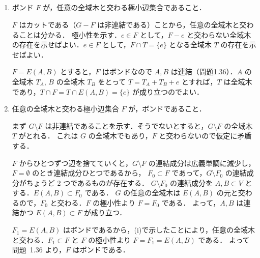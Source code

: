 \subsection{}
\begin{enumerate}
 \item ボンド $F$ が，任意の全域木と交わる極小辺集合であること．
 
 $F$ はカットである（$G-F$ は非連結である）ことから，任意の全域木と交わることは分かる．
 極小性を示す．$e\in F$ として，$F-e$ と交わらない全域木の存在を示せばよい．$e\in F$ として，$F\cap T = \{e\}$ となる全域木 $T$ の存在を示せばよい．
 
 $F = E(A, B)$ とすると，$F$ はボンドなので $A, B$ は連結（問題1.36）．$A$ の全域木 $T_A$, $B$ の全域木 $T_B$ をとって
 $T = T_A + T_B + e$ とすれば，$T$ は全域木であり，$T\cap F = T\cap E(A,B) = \{e\}$ が成り立つのでよい．
 
 \item 任意の全域木と交わる極小辺集合 $F$ が，ボンドであること．
 
 まず $G\setminus F$ は非連結であることを示す．そうでないとすると，$G\setminus F$ の全域木 $T$ がとれる．
 これは $G$ の全域木でもあり，$F$ と交わらないので仮定に矛盾する．
 
 $F$ からひとつずつ辺を捨てていくと，$G\setminus F$ の連結成分は広義単調に減少し，$F = \emptyset$ のとき連結成分ひとつであるから，
 $F_0\subset F$ であって，$G\setminus F_0$ の連結成分がちょうど $2$ つであるものが存在する．
 $G\setminus F_0$ の連結成分を $A, B\subset V$ とする．$E(A,B)\subset F_0$ である．
 $G$ の任意の全域木は $E(A, B)$ の元と交わるので，$F_0$ と交わる．$F$ の極小性より $F=F_0$ である．
 よって，$A,B$ は連結かつ $E(A,B) \subset F$ が成り立つ．
 
 $F_1 = E(A,B)$ はボンドであるから，(i)で示したことにより，任意の全域木と交わる．$F_1\subset F$ と $F$ の極小性より $F = F_1 = E(A,B)$ である．
 よって問題~1.36 より，$F$ はボンドである． 
\end{enumerate}